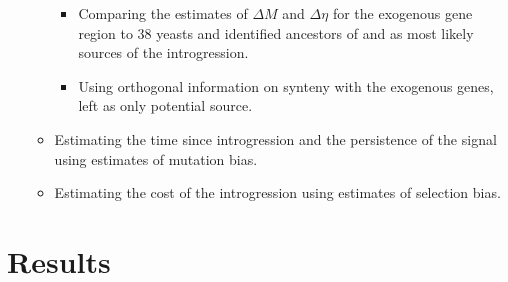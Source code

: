 \documentclass[12pt]{article}
\begin{document}
\begin{itemize}
\begin{itemize}
\begin{itemize}
			\item Comparing the estimates of $\Delta M$ and $\Delta \eta$ for the exogenous gene region to 38 yeasts and identified ancestors of \gossypii and \dubl as most likely sources of the introgression.
			\item Using orthogonal information on synteny with the exogenous genes, left \gossypii as only potential source.
		\end{itemize}
		\item Estimating the time since introgression and the persistence of the signal using estimates of mutation bias.
		\item Estimating the cost of the introgression using estimates of selection bias.
	\end{itemize}
\end{itemize}

\section*{Results}
	
\end{document}
